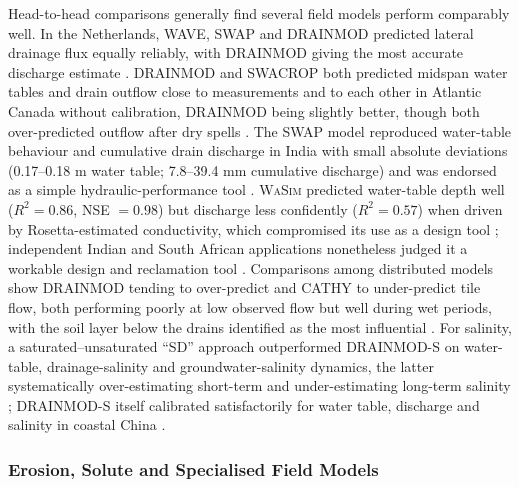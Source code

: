 \documentclass[11pt]{article}
\begin{document}
Head-to-head comparisons generally find several field models perform comparably well. In the Netherlands, WAVE, SWAP and \textsc{DRAINMOD} predicted lateral drainage flux equally reliably, with \textsc{DRAINMOD} giving the most accurate discharge estimate \parencite{ElSadek2001}. \textsc{DRAINMOD} and SWACROP both predicted midspan water tables and drain outflow close to measurements and to each other in Atlantic Canada without calibration, \textsc{DRAINMOD} being slightly better, though both over-predicted outflow after dry spells \parencite{Prasher1996}. The SWAP model reproduced water-table behaviour and cumulative drain discharge in India with small absolute deviations (0.17--0.18 m water table; 7.8--39.4 mm cumulative discharge) and was endorsed as a simple hydraulic-performance tool \parencite{Verma2014}. \textsc{WaSim} predicted water-table depth well ($R^2=0.86$, NSE $=0.98$) but discharge less confidently ($R^2=0.57$) when driven by Rosetta-estimated conductivity, which compromised its use as a design tool \parencite{Malota2022}; independent Indian and South African applications nonetheless judged it a workable design and reclamation tool \parencite{Hirekhan2007,Malota2024}. Comparisons among distributed models show DRAINMOD tending to over-predict and CATHY to under-predict tile flow, both performing poorly at low observed flow but well during wet periods, with the soil layer below the drains identified as the most influential \parencite{Muma2017}. For salinity, a saturated--unsaturated ``SD'' approach outperformed \textsc{DRAINMOD-S} on water-table, drainage-salinity and groundwater-salinity dynamics, the latter systematically over-estimating short-term and under-estimating long-term salinity \parencite{Nozari2021}; \textsc{DRAINMOD-S} itself calibrated satisfactorily for water table, discharge and salinity in coastal China \parencite{Feng2018}.

\subsubsection{Erosion, Solute and Specialised Field Models}
\end{document}
